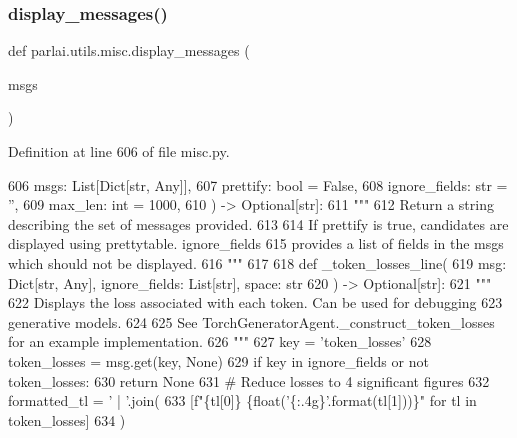\subsubsection{\texorpdfstring{display\+\_\+messages()}{display\_messages()}}
{\footnotesize\ttfamily def parlai.\+utils.\+misc.\+display\+\_\+messages (\begin{DoxyParamCaption}\item[{}]{msgs }\end{DoxyParamCaption})}



Definition at line 606 of file misc.\+py.


\begin{DoxyCode}
606     msgs: List[Dict[str, Any]],
607     prettify: bool = \textcolor{keyword}{False},
608     ignore\_fields: str = \textcolor{stringliteral}{''},
609     max\_len: int = 1000,
610 ) -> Optional[str]:
611     \textcolor{stringliteral}{"""}
612 \textcolor{stringliteral}{    Return a string describing the set of messages provided.}
613 \textcolor{stringliteral}{}
614 \textcolor{stringliteral}{    If prettify is true, candidates are displayed using prettytable. ignore\_fields}
615 \textcolor{stringliteral}{    provides a list of fields in the msgs which should not be displayed.}
616 \textcolor{stringliteral}{    """}
617 
618     \textcolor{keyword}{def }\_token\_losses\_line(
619         msg: Dict[str, Any], ignore\_fields: List[str], space: str
620     ) -> Optional[str]:
621         \textcolor{stringliteral}{"""}
622 \textcolor{stringliteral}{        Displays the loss associated with each token. Can be used for debugging}
623 \textcolor{stringliteral}{        generative models.}
624 \textcolor{stringliteral}{}
625 \textcolor{stringliteral}{        See TorchGeneratorAgent.\_construct\_token\_losses for an example implementation.}
626 \textcolor{stringliteral}{        """}
627         key = \textcolor{stringliteral}{'token\_losses'}
628         token\_losses = msg.get(key, \textcolor{keywordtype}{None})
629         \textcolor{keywordflow}{if} key \textcolor{keywordflow}{in} ignore\_fields \textcolor{keywordflow}{or} \textcolor{keywordflow}{not} token\_losses:
630             \textcolor{keywordflow}{return} \textcolor{keywordtype}{None}
631         \textcolor{comment}{# Reduce losses to 4 significant figures}
632         formatted\_tl = \textcolor{stringliteral}{' | '}.join(
633             [f\textcolor{stringliteral}{"\{tl[0]\} \{float('\{:.4g\}'.format(tl[1]))\}"} \textcolor{keywordflow}{for} tl \textcolor{keywordflow}{in} token\_losses]
634         )

\end{DoxyCode}
